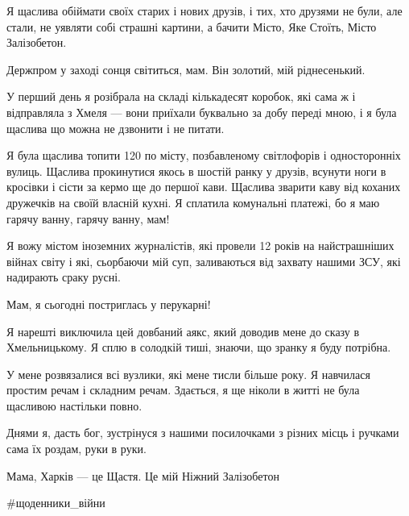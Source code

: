 Я щаслива обіймати своїх старих і нових друзів, і тих, хто друзями не були, але
стали, не уявляти собі страшні картини, а бачити Місто, Яке Стоїть, Місто
Залізобетон.


Держпром у заході сонця світиться, мам. Він золотий, мій ріднесенький.

У перший день я розібрала на складі кількадесят коробок, які сама ж і
відправляла з Хмеля — вони приїхали буквально за добу переді мною, і я була
щаслива що можна не дзвонити і не питати. 


Я була щаслива топити 120 по місту, позбавленому світлофорів і односторонніх
вулиць. Щаслива прокинутися якось в шостій ранку у друзів, всунути ноги в
кросівки і сісти за кермо ще до першої кави. Щаслива зварити каву від коханих
дружечків на своїй власній кухні. Я сплатила комунальні платежі, бо я маю
гарячу ванну, гарячу ванну, мам!


Я вожу містом іноземних журналістів, які провели 12 років на найстрашніших
війнах світу і які, сьорбаючи мій суп, заливаються від захвату нашими ЗСУ, які
надирають сраку русні. 


Мам, я сьогодні постриглась у перукарні!

Я нарешті виключила цей довбаний аякс, який доводив мене до сказу в
Хмельницькому. Я сплю в солодкій тиші, знаючи, що зранку я буду потрібна.

У мене розвязалися всі вузлики, які мене тисли більше року. Я навчилася простим
речам і складним речам. Здається, я ще ніколи в житті не була щасливою
настільки повно.

Днями я, дасть бог, зустрінуся з нашими посилочками з різних місць і ручками
сама їх роздам, руки в руки. 

Мама, Харків — це Щастя. Це мій Ніжний Залізобетон

\#щоденники\_війни
